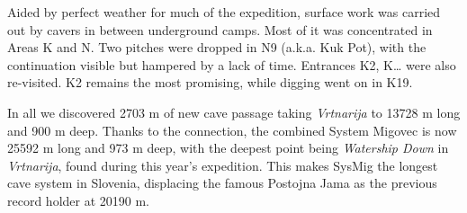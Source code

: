 Aided by perfect weather for much of the expedition, surface work was
carried out by cavers in between underground camps. Most of it was
concentrated in Areas K and N. Two pitches were dropped in N9 (a.k.a.
Kuk Pot), with the continuation visible but hampered by a lack of time.
Entrances K2, K\ldots{} were also re-visited. K2 remains the most
promising, while digging went on in K19.

In all we discovered 2703 m of new cave passage taking \emph{Vrtnarija}
to 13728 m long and 900 m deep. Thanks to the connection, the combined
System Migovec is now 25592 m long and 973 m deep, with the deepest
point being \emph{Watership Down} in \emph{Vrtnarija}, found during this
year's expedition. This makes SysMig the longest cave system in
Slovenia, displacing the famous Postojna Jama as the previous record
holder at 20190 m.
